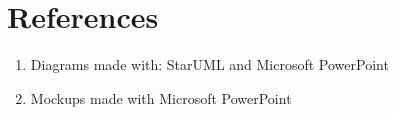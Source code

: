 \section{References}
\label{sec:ref}

\begin{enumerate}
    \item Diagrams made with: StarUML and Microsoft PowerPoint
    \item Mockups made with Microsoft PowerPoint
\end{enumerate}